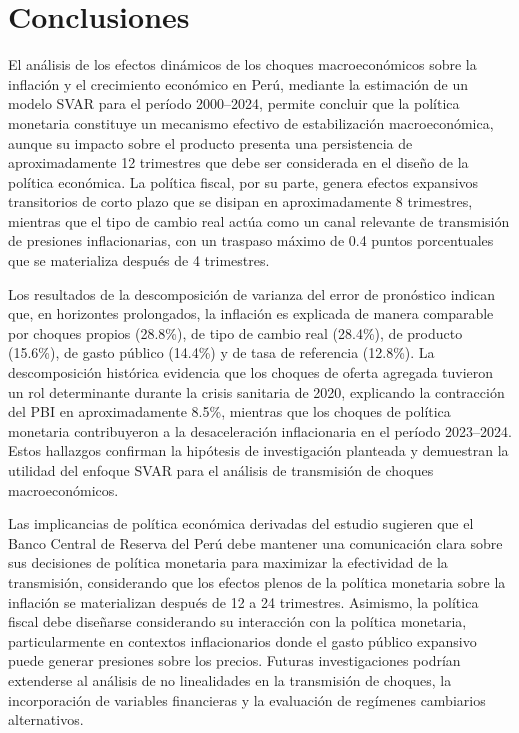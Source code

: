 \documentclass[12pt,a4paper]{article}
\begin{document}
\section{Conclusiones}

El análisis de los efectos dinámicos de los choques macroeconómicos sobre la inflación y el crecimiento económico en Perú, mediante la estimación de un modelo SVAR para el período 2000--2024, permite concluir que la política monetaria constituye un mecanismo efectivo de estabilización macroeconómica, aunque su impacto sobre el producto presenta una persistencia de aproximadamente 12 trimestres que debe ser considerada en el diseño de la política económica. La política fiscal, por su parte, genera efectos expansivos transitorios de corto plazo que se disipan en aproximadamente 8 trimestres, mientras que el tipo de cambio real actúa como un canal relevante de transmisión de presiones inflacionarias, con un traspaso máximo de 0.4 puntos porcentuales que se materializa después de 4 trimestres.

Los resultados de la descomposición de varianza del error de pronóstico indican que, en horizontes prolongados, la inflación es explicada de manera comparable por choques propios (28.8\%), de tipo de cambio real (28.4\%), de producto (15.6\%), de gasto público (14.4\%) y de tasa de referencia (12.8\%). La descomposición histórica evidencia que los choques de oferta agregada tuvieron un rol determinante durante la crisis sanitaria de 2020, explicando la contracción del PBI en aproximadamente 8.5\%, mientras que los choques de política monetaria contribuyeron a la desaceleración inflacionaria en el período 2023--2024. Estos hallazgos confirman la hipótesis de investigación planteada y demuestran la utilidad del enfoque SVAR para el análisis de transmisión de choques macroeconómicos.

Las implicancias de política económica derivadas del estudio sugieren que el Banco Central de Reserva del Perú debe mantener una comunicación clara sobre sus decisiones de política monetaria para maximizar la efectividad de la transmisión, considerando que los efectos plenos de la política monetaria sobre la inflación se materializan después de 12 a 24 trimestres. Asimismo, la política fiscal debe diseñarse considerando su interacción con la política monetaria, particularmente en contextos inflacionarios donde el gasto público expansivo puede generar presiones sobre los precios. Futuras investigaciones podrían extenderse al análisis de no linealidades en la transmisión de choques, la incorporación de variables financieras y la evaluación de regímenes cambiarios alternativos.
\end{document}
